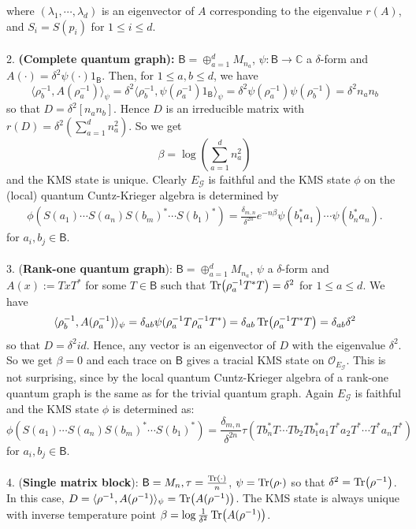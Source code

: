 \documentclass[a4paper,reqno]{amsart}
\numberwithin{equation}{section}
\numberwithin{theorem}{section}
\theoremstyle{definition}\newtheorem{definition}[theorem]{Definition}
\theoremstyle{definition}\newtheorem{remark}[theorem]{Remark}
\theoremstyle{definition}\newtheorem{example}[theorem]{Example}
\theoremstyle{definition}\newtheorem*{notation*}{Notation}
\theoremstyle{definition}\newtheorem*{convention*}{Convention}
\theoremstyle{definition}\newtheorem{observation}{Observation}
\theoremstyle{definition}\newtheorem*{acknowledgment*}{Acknowledgments}
\newcommand{\C}{\mathbb{C}}
\newcommand{\B}{\mathsf{B}}
\newcommand{\G}{\mathcal{G}}
\begin{document}
where $(\lambda_1,\cdots,\lambda_d)$ is an eigenvector of $A$ corresponding to the eigenvalue $r(A)$, and $S_i=S(p_i)$ for $1\leq i\leq d$.
\\
\\
2. \textbf{(Complete quantum graph): }$\B=\oplus_{a=1}^d{M_{n_a}}$, $\psi:\B\to\C$ a $\delta$-form and $A(\cdot)=\delta^2\psi(\cdot)1_\B$. Then, for $1\leq a,b\leq d$, we have
\[\langle\rho_b^{-1},A(\rho_a^{-1})\rangle_\psi=\delta^2\langle\rho_b^{-1}, \psi(\rho_a^{-1})1_\B\rangle_\psi=\delta^2\psi(\rho_a^{-1})\psi(\rho_{b}^{-1})=\delta^2 n_an_b\]
so that $D=\delta^2[n_an_b]$. Hence $D$ is an irreducible matrix with $r(D)=\delta^2(\sum_{a=1}^dn_a^2)$. So we get
\[\beta=\log(\sum_{a=1}^dn_a^2)\]
and the KMS state is unique. Clearly $E_\G$ is faithful and the KMS state $\phi$ on the (local) quantum Cuntz-Krieger algebra is determined by
\begin{align*}
    \phi(S(a_1)\cdots S(a_n)S(b_m)^*\cdots S(b_1)^*)=\frac{\delta_{m,n}}{\delta^{2n}}e^{-n\beta}\psi(b_1^*a_1)\cdots\psi(b_n^*a_n).
\end{align*}
for $a_i, b_j\in \B$.
\\
\\
3. (\textbf{Rank-one quantum graph}): $\B=\oplus_{a=1}^d M_{n_a}$, $\psi$  a $\delta$-form and $A(x):=TxT^*$ for some $T\in \B$ such that $\Tr(\rho_a^{-1}T^*T)=\delta^2$ for $1\leq a\leq d$. We have
\[\langle \rho_b^{-1}, A(\rho_a^{-1})\rangle_\psi=\delta_{ab}\psi(\rho_a^{-1}T\rho_a^{-1}T^*)=\delta_{ab}\Tr(\rho_a^{-1}T^*T)=\delta_{ab}\delta^2\]
so that $D=\delta^2 id$. Hence, any vector is an eigenvector of $D$ with the eigenvalue $\delta^2$. So we get $\beta=0$ and each trace on $\B$ gives a tracial KMS state on $\mathcal{O}_{E_{\G}}$. This is not surprising, since by \cite[Proposition 4.10]{BHINW} the local quantum Cuntz-Krieger algebra of a rank-one quantum graph is the same as for the trivial quantum graph. Again $E_\G$ is faithful and  the KMS state $\phi$ is determined as:
\[ \phi(S(a_1)\cdots S(a_n)S(b_m)^*\cdots S(b_1)^*)=\frac{\delta_{m,n}}{\delta^{2n}}\tau(Tb_n^*T\cdots Tb_2Tb_1^*a_1T^*a_2T^*\cdots T^*a_nT^*)\]
for $a_i,b_j\in \B$. 
\\
\\
4. (\textbf{Single matrix block}): $\B=M_n, \tau=\frac{\Tr(\cdot)}{n}$, $\psi=\Tr(\rho\cdot)$ so that $\delta^2=\Tr(\rho^{-1})$. In this case, $D=\langle\rho^{-1}, A(\rho^{-1})\rangle_\psi=\Tr(A(\rho^{-1}))$. The KMS state is always unique with inverse temperature point $\beta=\log \frac{1}{\delta^2}\Tr(A(\rho^{-1}))$.
\end{document}

